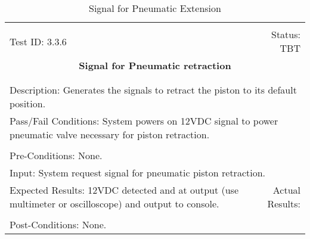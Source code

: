 \documentclass[titlepage]{article}
\begin{document}
\begin{center}%
\begin{table}[h!]
\begin{tabular}{|l r|}\hline&\\[-2mm]
	Test ID: 3.3.6	&Status: TBT\\[-3mm]
	\multicolumn{2}{|c|}{\textbf{\large{Signal for Pneumatic retraction}}}\\&\\\hline&\\[-3mm]
	\multicolumn{2}{|p{\textwidth}|}{Description: Generates the signals to retract the piston to its default position.}\\\hline
	\multicolumn{2}{|p{\textwidth}|}{Pass/Fail Conditions: System powers on 12VDC signal to power pneumatic valve necessary for piston retraction.}\\[1mm]\hline&\\[-3mm]
	\multicolumn{2}{|p{\textwidth}|}{Pre-Conditions: None.}\\[4mm]
	\multicolumn{2}{|p{\textwidth}|}{Input: System request signal for pneumatic piston retraction.}\\[2mm]\hline
	\multicolumn{1}{|p{0.49\textwidth}}{Expected Results: 12VDC detected and at output (use multimeter or oscilloscope) and output to console.}	&\multicolumn{1}{|p{0.45\textwidth}|}{Actual Results: }\\\hline&\\[-3mm]
	\multicolumn{2}{|p{\textwidth}|}{Post-Conditions: None.}\\\hline
\end{tabular}
\caption{Signal for Pneumatic Extension}
\end{table}
\end{center}
\end{document}
